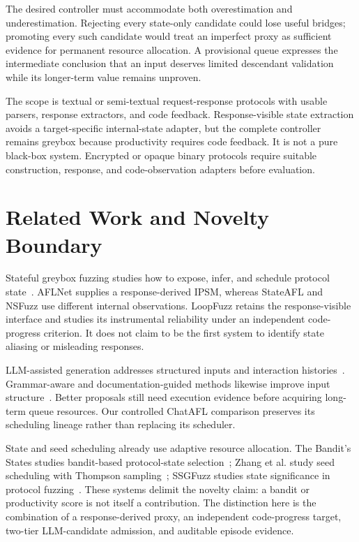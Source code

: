 \documentclass[final,5p,times,number]{elsarticle}
\begin{document}
The desired controller must accommodate both overestimation and underestimation. Rejecting every state-only candidate could lose useful bridges; promoting every such candidate would treat an imperfect proxy as sufficient evidence for permanent resource allocation. A provisional queue expresses the intermediate conclusion that an input deserves limited descendant validation while its longer-term value remains unproven.

The scope is textual or semi-textual request-response protocols with usable parsers, response extractors, and code feedback. Response-visible state extraction avoids a target-specific internal-state adapter, but the complete controller remains greybox because productivity requires code feedback. It is not a pure black-box system. Encrypted or opaque binary protocols require suitable construction, response, and code-observation adapters before evaluation.

\section{Related Work and Novelty Boundary}
Stateful greybox fuzzing studies how to expose, infer, and schedule protocol state~\cite{aflnet,stateafl,nsfuzz,sgf_usenix22}. AFLNet supplies a response-derived IPSM, whereas StateAFL and NSFuzz use different internal observations. LoopFuzz retains the response-visible interface and studies its instrumental reliability under an independent code-progress criterion. It does not claim to be the first system to identify state aliasing or misleading responses.

LLM-assisted generation addresses structured inputs and interaction histories~\cite{chatafl,fuzz4all_universal_fuzzing_large_2024,llmif_augmented_large_language_2024}. Grammar-aware and documentation-guided methods likewise improve input structure~\cite{gramatron_effective_grammar_aware_2021,carpetfuzz_documentation_2023}. Better proposals still need execution evidence before acquiring long-term queue resources. Our controlled ChatAFL comparison preserves its scheduling lineage rather than replacing its scheduler.

State and seed scheduling already use adaptive resource allocation. The Bandit's States studies bandit-based protocol-state selection~\cite{bandits_states2023}; Zhang et al. study seed scheduling with Thompson sampling~\cite{zhang2026thompson}; SSGFuzz studies state significance in protocol fuzzing~\cite{ssgfuzz2026}. These systems delimit the novelty claim: a bandit or productivity score is not itself a contribution. The distinction here is the combination of a response-derived proxy, an independent code-progress target, two-tier LLM-candidate admission, and auditable episode evidence.
\end{document}
